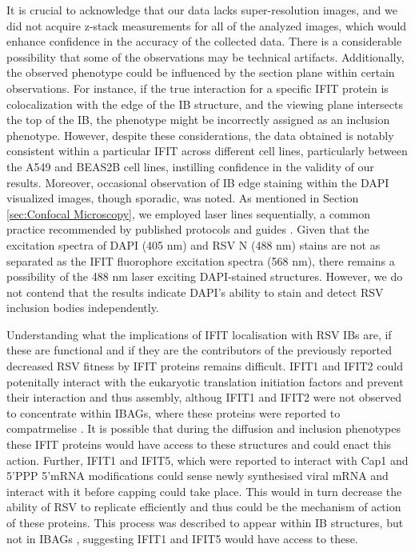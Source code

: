 It is crucial to acknowledge that our data lacks super-resolution images, and we did not acquire z-stack measurements for all of the analyzed images, which would enhance confidence in the accuracy of the collected data. There is a considerable possibility that some of the observations may be technical artifacts. Additionally, the observed phenotype could be influenced by the section plane within certain observations. For instance, if the true interaction for a specific IFIT protein is colocalization with the edge of the IB structure, and the viewing plane intersects the top of the IB, the phenotype might be incorrectly assigned as an inclusion phenotype. However, despite these considerations, the data obtained is notably consistent within a particular IFIT across different cell lines, particularly between the A549 and BEAS2B cell lines, instilling confidence in the validity of our results. Moreover, occasional observation of IB edge staining within the DAPI visualized images, though sporadic, was noted. As mentioned in Section \ref{sec:Confocal Microscopy}, we employed laser lines sequentially, a common practice recommended by published protocols and guides \cite{Jonkman2020Tutorial:Microscopy}. Given that the excitation spectra of DAPI (405 nm) and RSV N (488 nm) stains are not as separated as the IFIT fluorophore excitation spectra (568 nm), there remains a possibility of the 488 nm laser exciting DAPI-stained structures. However, we do not contend that the results indicate DAPI's ability to stain and detect RSV inclusion bodies independently.



Understanding what the implications of IFIT localisation with RSV IBs are, if these are functional and if they are the contributors of the previously reported decreased RSV fitness by IFIT proteins remains difficult. IFIT1 and IFIT2 could potenitally interact with the eukaryotic translation initiation factors \cite{Diamond2014IFIT1:Translation, Guo2000CharacterizationVirus} and prevent their interaction and thus assembly, althoug IFIT1 and IFIT2 were not observed to concentrate within IBAGs, where these proteins were reported to compatrmelise \cite{Jobe2023ViralCondensates}. It is possible that during the diffusion and inclusion phenotypes these IFIT proteins would have access to these structures and could enact this action. Further, IFIT1 and IFIT5, which were reported to interact with Cap1 and 5'PPP 5'mRNA modifications \cite{Kumar2014InhibitionMRNAs} could sense newly synthesised viral mRNA and interact with it before capping could take place. This would in turn decrease the ability of RSV to replicate efficiently and thus could be the mechanism of action of these proteins. This process was described to appear within IB structures, but not in IBAGs \cite{Rincheval2017FunctionalVirus}, suggesting IFIT1 and IFIT5 would have access to these. 



